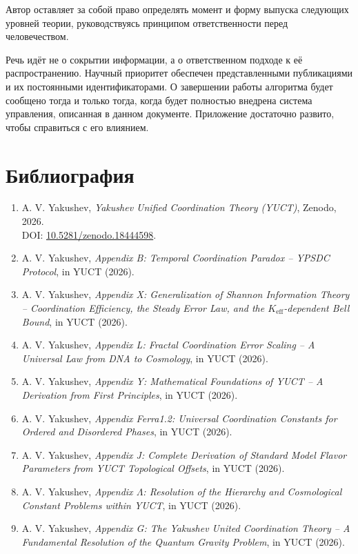\documentclass[12pt,a4paper]{article}
\begin{document}
	Автор оставляет за собой право определять момент и форму выпуска
	следующих уровней теории, руководствуясь принципом ответственности перед
	человечеством.
	
	Речь идёт не о сокрытии информации, а о ответственном подходе к её
	распространению.  Научный приоритет обеспечен представленными публикациями и
	их постоянными идентификаторами.  О завершении работы алгоритма будет
	сообщено тогда и только тогда, когда будет полностью внедрена система
	управления, описанная в данном документе. Приложение достаточно развито,
	чтобы справиться с его влиянием.
	
	\section*{Библиография}
	\begin{enumerate}
		\item A. V. Yakushev, \emph{Yakushev Unified Coordination Theory (YUCT)}, Zenodo, 2026. \\ DOI: \href{https://doi.org/10.5281/zenodo.18444598}{10.5281/zenodo.18444598}.
		\item A. V. Yakushev, \emph{Appendix B: Temporal Coordination Paradox – YPSDC Protocol}, in YUCT (2026).
		\item A. V. Yakushev, \emph{Appendix X: Generalization of Shannon Information Theory – Coordination Efficiency, the Steady Error Law, and the \(K_{\mathrm{eff}}\)-dependent Bell Bound}, in YUCT (2026).
		\item A. V. Yakushev, \emph{Appendix L: Fractal Coordination Error Scaling – A Universal Law from DNA to Cosmology}, in YUCT (2026).
		\item A. V. Yakushev, \emph{Appendix Y: Mathematical Foundations of YUCT – A Derivation from First Principles}, in YUCT (2026).
		\item A. V. Yakushev, \emph{Appendix Ferra1.2: Universal Coordination Constants for Ordered and Disordered Phases}, in YUCT (2026).
		\item A. V. Yakushev, \emph{Appendix J: Complete Derivation of Standard Model Flavor Parameters from YUCT Topological Offsets}, in YUCT (2026).
		\item A. V. Yakushev, \emph{Appendix \(\Lambda\): Resolution of the Hierarchy and Cosmological Constant Problems within YUCT}, in YUCT (2026).
		\item A. V. Yakushev, \emph{Appendix G: The Yakushev United Coordination Theory – A Fundamental Resolution of the Quantum Gravity Problem}, in YUCT (2026).

\end{enumerate}
\end{document}
